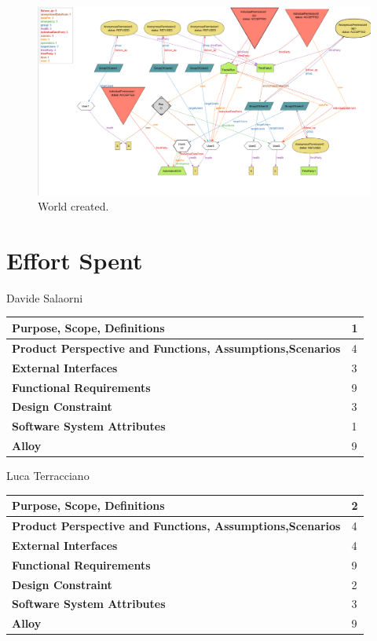 \documentclass[a4paper]{article}
\begin{document}
\clearpage

\begin{figure}
    \centering
    \includegraphics[width=\textwidth]{worldAlloy}
    \caption{World created.}
\end{figure}

\clearpage
    
\section{Effort Spent}

Davide Salaorni

\begin{center}
\begin{tabular}{|l | l |}
    \hline \bf{Purpose, Scope, Definitions} & 1 \\ \hline
    \bf{Product Perspective and Functions, Assumptions,Scenarios}  & 4 \\ \hline
    \bf{External Interfaces} & 3 \\ \hline
    \bf{Functional Requirements} & 9 \\ \hline
    \bf{Design Constraint} & 3\\ \hline
    \bf{Software System Attributes} & 1 \\ \hline
    \bf{Alloy} & 9 \\ \hline
\end{tabular}
\end{center}

\noindent  Luca Terracciano

    \begin{center}
\begin{tabular}{|l | l |}
    \hline \bf{Purpose, Scope, Definitions} & 2 \\ \hline
    \bf{Product Perspective and Functions, Assumptions,Scenarios}  & 4 \\ \hline
    \bf{External Interfaces} & 4 \\ \hline
    \bf{Functional Requirements} & 9 \\ \hline
    \bf{Design Constraint} & 2\\ \hline
    \bf{Software System Attributes} & 3 \\ \hline
    \bf{Alloy} & 9 \\ \hline
\end{tabular}
\end{center}
\end{document}
